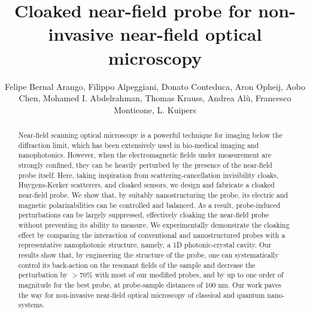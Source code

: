 \documentclass{osa-article}
\begin{document}
	
	\title{Cloaked near-field probe for non-invasive near-field optical microscopy}
	
	\author{Felipe Bernal Arango, Filippo Alpeggiani, Donato Conteduca, Aron Opheij, Aobo Chen, Mohamed I. Abdelrahman, Thomas Krauss, Andrea Al\`u, Francesco Monticone, L. Kuipers}
	
	\address{Department of Quantum Nanoscience, Delft University of Technology, Delft, The Netherlands\\
	Department of Physics, University of York, York, United Kingdom\\
	Advanced Science Research Center,	City University of New York, New York, NY, 10031, USA\\
	School of Electrical and Computer Engineering, Cornell University, Ithaca, NY, 14853, USA}



	\begin{abstract}
		Near-field scanning optical microscopy is a powerful technique for imaging below the diffraction limit, which has been extensively used in bio-medical imaging and nanophotonics. However, when the electromagnetic fields under measurement are strongly confined, they can be heavily perturbed by the presence of the near-field probe itself. Here, taking inspiration from scattering-cancellation invisibility cloaks, Huygens-Kerker scatterers, and cloaked sensors, we design and fabricate a cloaked near-field probe. We show that, by suitably nanostructuring the probe, its electric and magnetic polarizabilities can be controlled and balanced. As a result, probe-induced perturbations can be largely suppressed, effectively cloaking the near-field probe without preventing its ability to measure. We experimentally demonstrate the cloaking effect by comparing the interaction of conventional and nanostructured probes with a representative nanophotonic structure, namely, a 1D photonic-crystal cavity. Our results show that, by engineering the structure of the probe, one can systematically control its back-action on the resonant fields of the sample and decrease the perturbation by $>$70\% with most of our modified probes, and by up to one order of magnitude for the best probe, at probe-sample distances of 100 nm. Our work paves the way for non-invasive near-field optical microscopy of classical and quantum nano-systems.
	\end{abstract}
	
\end{document}
